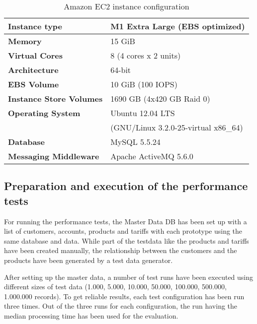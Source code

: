 \begin{table}[htbp]
	\renewcommand{\arraystretch}{1.3}
	\caption{Amazon EC2 instance configuration}
	\label{table:ch4_amazon_ec2}
	\centering
	\begin{tabular}{|l|p{3.5cm}|}
		\hline
		\bfseries Instance type & M1 Extra Large (EBS optimized)\\
		\hline
		\bfseries Memory & 15 GiB\\
		\hline
		\bfseries Virtual Cores & 8 (4 cores x 2 units)\\
		\hline
		\bfseries Architecture & 64-bit\\
		\hline
		\bfseries EBS Volume & 10 GiB (100 IOPS)\\
		\hline
		\bfseries Instance Store Volumes & 1690 GB (4x420 GB Raid 0)\\
		\hline
		\bfseries Operating System & Ubuntu 12.04 LTS\\
		& (GNU/Linux 3.2.0-25-virtual x86\_64)\\
		\hline 
		\bfseries Database & MySQL 5.5.24\\
		\hline
		\bfseries Messaging Middleware & Apache ActiveMQ 5.6.0\\
		\hline
	\end{tabular}
\end{table}

\subsection{Preparation and execution of the performance tests}
For running the performance tests, the Master Data DB has been set up with a list of customers, accounts, products and tariffs with each prototype using the same database and data. While part of the testdata like the products and tariffs have been created manually, the relationship between the customers and the products have been generated by a test data generator.

After setting up the master data, a number of test runs have been executed using different sizes of test data (1.000, 5.000, 10.000, 50.000, 100.000, 500.000, 1.000.000 records). To get reliable results, each test configuration has been run three times. Out of the three runs for each configuration, the run having the median processing time has been used for the evaluation.

